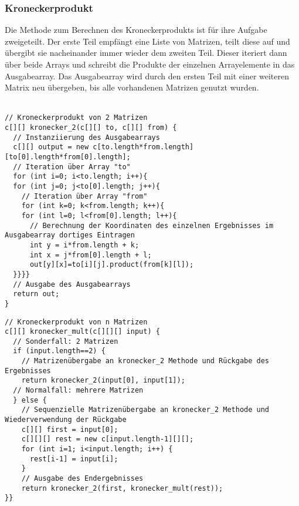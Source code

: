 \documentclass[12pt]{report}
\begin{document}
\subsubsection{Kroneckerprodukt}
Die Methode zum Berechnen des Kroneckerprodukts ist für ihre Aufgabe zweigeteilt.
Der erste Teil empfängt eine Liste von Matrizen, teilt diese auf und übergibt sie nacheinander immer wieder dem zweiten Teil. Dieser iteriert dann über beide Arrays und schreibt die Produkte der einzelnen Arrayelemente in das Ausgabearray. Das Ausgabearray wird durch den ersten Teil mit einer weiteren Matrix neu übergeben, bis alle vorhandenen Matrizen genutzt wurden.\\
\vspace{-0.7cm}\\
\lstset{escapechar=@,style=customcsmall}
\noindent\begin{minipage}[t]{.50\textwidth} 
\hspace*{0pt}
\begin{lstlisting} 
// Kroneckerprodukt von 2 Matrizen
c[][] kronecker_2(c[][] to, c[][] from) {
  // Instanziierung des Ausgabearrays
  c[][] output = new c[to.length*from.length] [to[0].length*from[0].length];
  // Iteration über Array "to"
  for (int i=0; i<to.length; i++){
  for (int j=0; j<to[0].length; j++){
    // Iteration über Array "from"
    for (int k=0; k<from.length; k++){    
    for (int l=0; l<from[0].length; l++){
      // Berechnung der Koordinaten des einzelnen Ergebnisses im Ausgabearray dortiges Eintragen
      int y = i*from.length + k;
      int x = j*from[0].length + l;
      out[y][x]=to[i][j].product(from[k][l]);
  }}}}
  // Ausgabe des Ausgabearrays
  return out;
}
\end{lstlisting} 
\end{minipage}
\hfill \hspace{0.2cm}
\begin{minipage}[t]{.49\textwidth} 
\hspace*{0pt}\begin{lstlisting}
// Kroneckerprodukt von n Matrizen
c[][] kronecker_mult(c[][][] input) {
  // Sonderfall: 2 Matrizen
  if (input.length==2) {
    // Matrizenübergabe an kronecker_2 Methode und Rückgabe des Ergebnisses
    return kronecker_2(input[0], input[1]);
  // Normalfall: mehrere Matrizen
  } else {
    // Sequenzielle Matrizenübergabe an kronecker_2 Methode und Wiederverwendung der Rückgabe
    c[][] first = input[0];
    c[][][] rest = new c[input.length-1][][];
    for (int i=1; i<input.length; i++) {
      rest[i-1] = input[i];
    }
    // Ausgabe des Endergebnisses
    return kronecker_2(first, kronecker_mult(rest));
}}
\end{lstlisting} 
\end{minipage}
\end{document}
